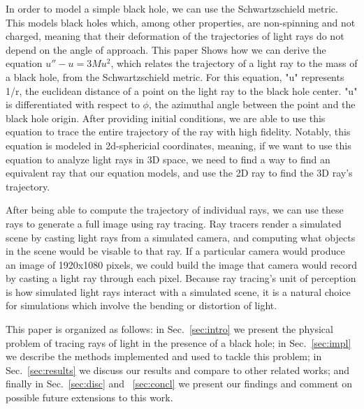In order to model a simple black hole, we can use the Schwartzschield metric. This models black holes which, among other properties, are non-spinning and not charged, meaning that their deformation of the trajectories of light rays do not depend on the angle of approach. This paper \cite {federov2019notes}  Shows how we can derive the equation $ u'' - u = 3Mu^2 $, which relates the trajectory of a light ray to the mass of a black hole, from the Schwartzschield metric. For this equation, "u" represents 1/r, the euclidean distance of a point on the light ray to the black hole center. "u" is differentiated with respect to $ \phi $, the azimuthal angle between the point and the black hole origin. After providing initial conditions, we are able to use this equation to trace the entire trajectory of the ray with high fidelity. Notably, this equation is modeled in 2d-sphericial coordinates, meaning, if we want to use this equation to analyze light rays in 3D space, we need to find a way to find an equivalent ray that our equation models, and use the 2D ray to find the 3D ray's trajectory.

After being able to compute the trajectory of individual rays, we can use these rays to generate a full image using ray tracing. Ray tracers render a simulated scene by casting light rays from a simulated camera, and computing what objects in the scene would be visable to that ray. If a particular camera would produce an image of 1920x1080 pixels, we could build the image that camera would record by casting a light ray through each pixel. Because ray tracing's unit of perception is how simulated light rays interact with a simulated scene, it is a natural choice for simulations which involve the bending or distortion of light.


This paper is organized as follows:
in Sec.~\ref{sec:intro} we present the physical problem of tracing rays of light in the presence of a black hole;
in Sec.~\ref{sec:impl} we describe the methods implemented and used to tackle this problem;
in Sec.~\ref{sec:results} we discuss our results and compare to other related works;
and finally in Sec.~\ref{sec:disc} and ~\ref{sec:concl} we present our findings and comment
on possible future extensions to this work.




